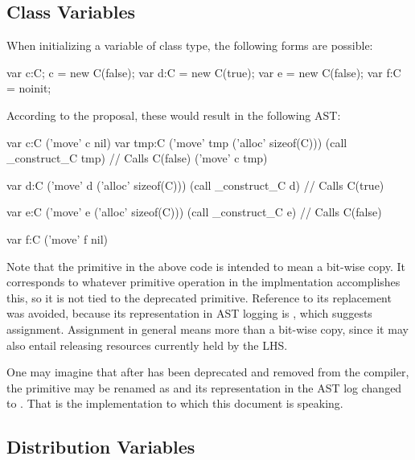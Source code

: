 \subsection{Class Variables}
When initializing a variable of class type, the following forms are possible:
\begin{chapel}
  var c:C; c = new C(false);
  var d:C = new C(true);
  var e = new C(false);
  var f:C = noinit;
\end{chapel}
\noindent
According to the proposal, these would result in the following AST:
\begin{numberedchapel}
  var c:C
  ('move' c nil)
  var tmp:C
  ('move' tmp ('alloc' sizeof(C)))
  (call _construct_C tmp) // Calls C(false)
  ('move' c tmp)

  var d:C
  ('move' d ('alloc' sizeof(C)))
  (call _construct_C d) // Calls C(true)

  var e:C
  ('move' e ('alloc' sizeof(C)))
  (call _construct_C e) // Calls C(false)

  var f:C
  ('move' f nil)
\end{numberedchapel}
\noindent
Note that the primitive  in the above code is intended to mean a bit-wise
copy.  It corresponds to whatever primitive operation in the implmentation accomplishes
this, so it is not tied to the deprecated  primitive.  Reference to its
replacement  was avoided, because its representation in AST logging is
, which suggests assignment.  Assignment in general means more than a
bit-wise copy, since it may also entail releasing resources currently held by the LHS.

One may imagine that after  has been deprecated and removed from the
compiler, the  primitive may be renamed as  and its
representation in the AST log changed to .  That is the implementation to
which this document is speaking.


\subsection{Distribution Variables}

